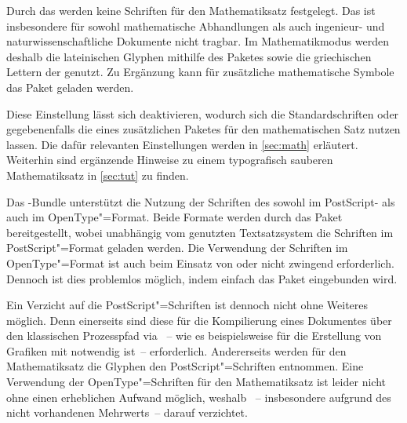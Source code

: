 \begin{Declaration*}{}
\begin{Declaration*}{}
\begin{Declaration*}{}
Durch das \CD werden keine Schriften für den Mathematiksatz festgelegt. Das ist 
insbesondere für sowohl mathematische Abhandlungen als auch ingenieur- und 
naturwissenschaftliche Dokumente nicht tragbar. Im Mathematikmodus werden 
deshalb die lateinischen Glyphen mithilfe des Paketes 
sowie die griechischen Lettern der \OpenSans genutzt. Zu Ergänzung kann für 
zusätzliche mathematische Symbole das Paket  geladen werden.

Diese Einstellung lässt sich deaktivieren, wodurch sich die Standardschriften 
oder gegebenenfalls die eines zusätzlichen Paketes für den mathematischen Satz 
nutzen lassen. Die dafür relevanten Einstellungen werden in \autoref{sec:math} 
erläutert. Weiterhin sind ergänzende Hinweise zu einem typografisch sauberen
Mathematiksatz in \autoref{sec:tut} zu finden.


%
%
%
Das \TUDScript-Bundle unterstützt die Nutzung der Schriften des \CDs sowohl 
im PostScript- als auch im OpenType"=Format. Beide Formate werden durch das
Paket  bereitgestellt, wobei unabhängig vom genutzten 
Textsatzsystem die Schriften im PostScript"=Format geladen werden. Die 
Verwendung der Schriften im OpenType"=Format ist auch beim Einsatz von 
 oder  nicht zwingend erforderlich. Dennoch 
ist dies problemlos möglich, indem einfach das Paket  
eingebunden wird.

Ein Verzicht auf die PostScript"=Schriften ist dennoch nicht ohne Weiteres 
möglich. Denn einerseits sind diese für die Kompilierung eines Dokumentes über 
den klassischen Prozesspfad via ~-- wie es 
beispielsweise für die Erstellung von Grafiken mit  notwendig 
ist~-- erforderlich. Andererseits werden für den Mathematiksatz die Glyphen den 
PostScript"=Schriften entnommen. Eine Verwendung der OpenType"=Schriften für 
den Mathematiksatz ist leider nicht ohne einen erheblichen Aufwand möglich, 
weshalb \TUDScript~-- insbesondere aufgrund des nicht vorhandenen Mehrwerts~-- 
darauf verzichtet.
%




\end{Declaration*}
\end{Declaration*}
\end{Declaration*}

